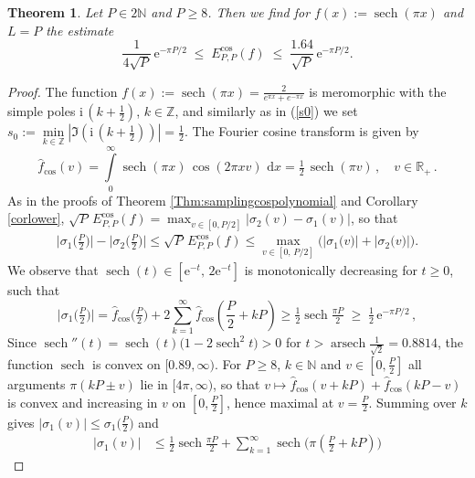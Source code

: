 \documentclass[11pt,a4paper]{scrartcl}
\renewcommand{\d}{\,\mathrm{d}}
\newtheorem{theorem}{Theorem}[section]
\numberwithin{equation}{section}
\numberwithin{table}{section}
\numberwithin{figure}{section}
\newcommand{\e}{\mathrm e}
\renewcommand{\i}{\mathrm i}
\newcommand{\Z}{\mathbb Z}
\newcommand{\N}{\mathbb N}
\newcommand{\Rp}{{\mathbb R}_{+}}
\newcommand{\fcos}{{\hat f}_{\cos}}
\newcommand{\Ecos}{E^{\cos}}
\begin{document}
\begin{theorem}
	\label{Ex:sech} Let $P \in 2 \N$  and $P \ge 8$. Then we find for $f(x) := \operatorname{sech}(\pi x)$ and $L=P$ the estimate
	\begin{equation}
		\label{eq:sechlower}
		\textstyle
		 \frac{1}{4\sqrt P}\,\e^{-\pi P/2} \;\leq\;
		\Ecos_{P,P}(f) \;\leq\; \frac{1.64}{\sqrt{P}}\,\e^{-\pi P/2}  .
	\end{equation}

\end{theorem}	
\begin{proof}
	The function $f(x) := \operatorname{sech}(\pi x) = \frac{2}{e^{\pi x} + e^{-\pi x}}$ is meromorphic with the
	simple poles $\i\,(k+\tfrac12)$, $k \in \Z$, and similarly as in (\ref{s0}) we set $s_0:=  \min\limits_{k \in {\mathbb Z}} |\Im( \i\,(k+\tfrac12))| = \frac{1}{2}$. The  Fourier cosine transform is given by
	$$
	\fcos(v) =  \textstyle \int\limits_0^{\infty} \operatorname{sech}(\pi x)\,\cos(2\pi x v)\,\d x
	= \tfrac12\,\operatorname{sech}(\pi v)\,, \quad v \in \Rp\,.
	$$
As in the proofs of Theorem \ref{Thm:samplingcospolynomial} and Corollary \ref{corlower},
$\sqrt{P}\,\Ecos_{P,P}(f) = \max_{v \in [0, P/2]} |\sigma_2(v)-\sigma_1(v)|$, so that
\begin{align}\label{eq:ung}
 \textstyle
\big|\sigma_1\big(\frac{P}{2}\big)\big| - \big|\sigma_2\big(\frac{P}{2}\big)\big| \le \sqrt{P} \, \Ecos_{P,P}(f)
\le   \max\limits_{v \in [0,\, P/2]} \big(\big|\sigma_1\big(v)\big| + \big|\sigma_2\big(v)\big| \big).
\end{align}
We observe that  $ \operatorname{sech} (t)
 \in [ \e^{-t} , \,  2 \e^{-t}]$ is monotonically decreasing
 for $t \ge 0$, such that
$$
 \textstyle \big|\sigma_1\big(\tfrac P2\big)\big|= \fcos\big(\tfrac P2\big) + 2 \sum\limits_{k=1}^\infty \fcos(\frac{P}{2} + kP) \ge  \tfrac12\operatorname{sech}\tfrac{\pi P}{2} \;\geq\; \tfrac12\,\e^{-\pi P/2}\,,
$$
Since $\operatorname{sech}''(t) = \operatorname{sech}(t)\big(1-2\operatorname{sech}^2 t\big)>0$
for $t > \operatorname{arsech}\frac{1}{\sqrt2} = 0.8814$, the function $\operatorname{sech}$ is
convex on $[0.89,\infty)$. For $P \ge 8$, $k \in \N$ and $v \in [0,\frac P2]$ all arguments
$\pi(kP\pm v)$ lie in $[ 4 \pi,\infty)$, so that
$v \mapsto \fcos(v+kP)+\fcos(kP-v)$ is convex
 and increasing in $v$ on $[0,\frac P2]$, hence maximal at
$v=\frac P2$. Summing over $k$ gives $|\sigma_1(v)| \le \sigma_1\big(\frac P2\big)$ and
\begin{align*}
 \textstyle \big|\sigma_1(v)\big| &\le   \textstyle
 \tfrac{1}{2}\operatorname{sech}\tfrac{\pi P}{2} +  \sum\limits_{k=1}^\infty \operatorname{sech}\big(\pi(\tfrac P2 + kP)\big)

\end{align*}
\end{proof}
\end{document}
